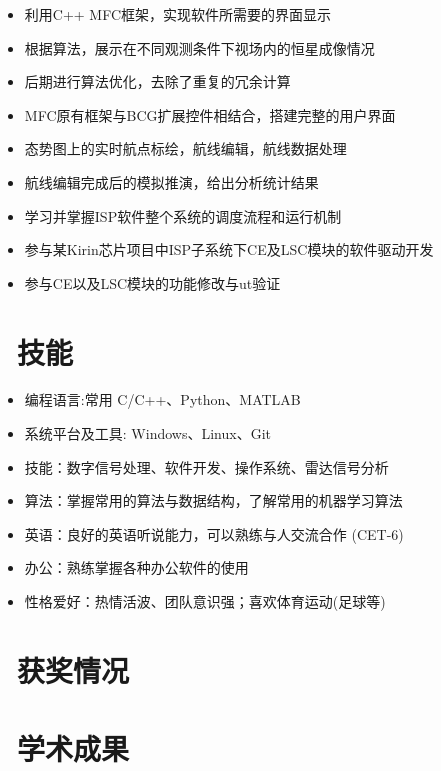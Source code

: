 \documentclass{resume}
\begin{document}
\begin{itemize}[topsep = 0 pt, partopsep = 0pt]
  \item 利用C++ MFC框架，实现软件所需要的界面显示
  \item 根据算法，展示在不同观测条件下视场内的恒星成像情况
  \item 后期进行算法优化，去除了重复的冗余计算
\end{itemize}

\begin{itemize}[topsep = 0 pt, partopsep = 0pt]
  \item MFC原有框架与BCG扩展控件相结合，搭建完整的用户界面
  \item 态势图上的实时航点标绘，航线编辑，航线数据处理
  \item 航线编辑完成后的模拟推演，给出分析统计结果
\end{itemize}

\begin{itemize}[topsep = 0 pt, partopsep = 0pt]
  \item 学习并掌握ISP软件整个系统的调度流程和运行机制
  \item 参与某Kirin芯片项目中ISP子系统下CE及LSC模块的软件驱动开发
  \item 参与CE以及LSC模块的功能修改与ut验证
\end{itemize}

\section{\faCogs\ 技能}
\begin{itemize}[parsep=0.5ex]
  \item 编程语言:常用 C/C++、Python、MATLAB  
  \item 系统平台及工具: Windows、Linux、Git
  \item 技能：数字信号处理、软件开发、操作系统、雷达信号分析
  \item 算法：掌握常用的算法与数据结构，了解常用的机器学习算法
  \item 英语：良好的英语听说能力，可以熟练与人交流合作 (CET-6)
  \item  办公：熟练掌握各种办公软件的使用
  \item  性格爱好：热情活波、团队意识强；喜欢体育运动(足球等)
\end{itemize}

\section{\faHeartO\ 获奖情况}

\section{\faGraduationCap\ 学术成果}
\end{document}
